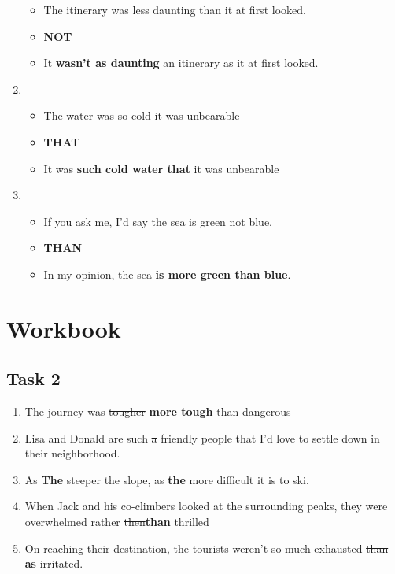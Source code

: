 \documentclass[a4paper]{article}
\begin{document}
\begin{enumerate}
\begin{itemize}
        \item The itinerary was less daunting than it at first looked.
        \item \textbf{NOT}
        \item It \textbf{wasn't as daunting} an itinerary as it at first looked.
    \end{itemize}
    \item \begin{itemize}
        \item The water was so cold it was unbearable 
        \item \textbf{THAT}
        \item It was \textbf{such cold water that} it was unbearable
    \end{itemize}
    \item \begin{itemize}
        \item If you ask me, I'd say the sea is green not blue.
        \item \textbf{THAN}
        \item In my opinion, the sea \textbf{is more green than blue}.
    \end{itemize}
\end{enumerate}
\section*{Workbook}
\subsection{Task 2}
\begin{enumerate}
    \item The journey was \st{tougher} \textbf{more tough} than dangerous
    \item Lisa and Donald are such \st{a} friendly people that I'd love to settle down in their neighborhood.
    \item \st{As} \textbf{The} steeper the slope, \st{as} \textbf{the} more difficult it is to ski.
    \item When Jack and his co-climbers looked at the surrounding peaks, they were overwhelmed rather \st{then}\textbf{than} thrilled
    \item On reaching their destination, the tourists weren't so much exhausted \st{than} \textbf{as} irritated.
\end{enumerate}
\end{document}
